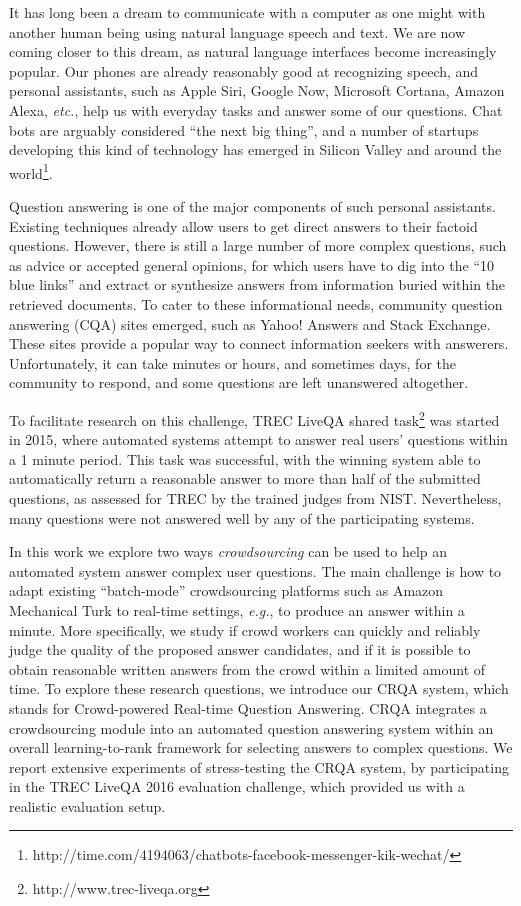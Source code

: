 It has long been a dream to communicate with a computer as one might with another human being using natural language speech and text.
We are now coming closer to this dream, as natural language interfaces become increasingly popular.
Our phones are already reasonably good at recognizing speech, and personal assistants, such as Apple Siri, Google Now, Microsoft Cortana, Amazon Alexa, \textit{etc.}, help us with everyday tasks and answer some of our questions.
Chat bots are arguably considered ``the next big thing'', and a number of startups developing this kind of technology has emerged in Silicon Valley and around the world\footnote{http://time.com/4194063/chatbots-facebook-messenger-kik-wechat/}.

Question answering is one of the major components of such personal assistants.
Existing techniques already allow users to get direct answers to their factoid questions.
However, there is still a large number of more complex questions, such as advice or accepted general opinions, for which users have to dig into the ``10 blue links'' and extract or synthesize answers from information buried within the retrieved documents.
To cater to these informational needs, community question answering (CQA) sites emerged, such as Yahoo! Answers and Stack Exchange.
These sites provide a popular way to connect information seekers with answerers.
Unfortunately, it can take minutes or hours, and sometimes days, for the community to respond, and some questions are left unanswered altogether. 

To facilitate research on this challenge, TREC LiveQA shared task\footnote{http://www.trec-liveqa.org} was started in 2015, where automated systems attempt to answer real users' questions within a 1 minute period.
This task was successful, with the winning system able to automatically return a reasonable answer to more than half of the submitted questions, as assessed for TREC by the trained judges from NIST.
Nevertheless, many questions were not answered well by any of the participating systems.

In this work we explore two ways \textit{crowdsourcing} can be used to help an automated system answer complex user questions.
The main challenge is how to adapt existing ``batch-mode'' crowdsourcing platforms such as Amazon Mechanical Turk to real-time settings, \textit{e.g.}, to produce an answer within a minute.
More specifically, we study if crowd workers can quickly and reliably judge the quality of the proposed answer candidates, and if it is possible to obtain reasonable written answers from the crowd within a limited amount of time.
To explore these research questions, we introduce our CRQA system, which stands for Crowd-powered Real-time Question Answering.
CRQA integrates a crowdsourcing module into an automated question answering system within an overall learning-to-rank framework for selecting answers to complex questions.
We report extensive experiments of stress-testing the CRQA system, by participating in the TREC LiveQA 2016 evaluation challenge, which provided us with a realistic evaluation setup.

